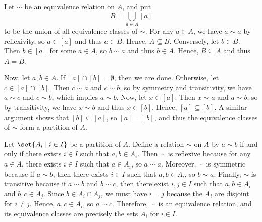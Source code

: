 \begin{proofnum}
    \item Let $\sim$ be an equivalence relation on $A$, and put
    \[
        B = \bigcup_{a \in A} [a]
    \]
    to be the union of all equivalence classes of $\sim$.
    For any $a \in A$, we have $a \sim a$ by reflexivity, so $a \in [a]$ and thus $a \in B$.
    Hence, $A \subseteq B$.
    Conversely, let $b \in B$.
    Then $b \in [a]$ for some $a \in A$, so $b \sim a$ and thus $b \in A$.
    Hence, $B \subseteq A$ and thus $A = B$.

    Now, let $a, b \in A$.
    If $[a] \cap [b] = \emptyset$, then we are done.
    Otherwise, let $c \in [a] \cap [b]$.
    Then $c \sim a$ and $c \sim b$, so by symmetry and transitivity, we have $a \sim c$ and $c \sim b$, which implies $a \sim b$.
    Now, let $x \in [a]$.
    Then $x \sim a$ and $a \sim b$, so by transitivity, we have $x \sim b$ and thus $x \in [b]$.
    Hence, $[a] \subseteq [b]$.
    A similar argument shows that $[b] \subseteq [a]$, so $[a] = [b]$, and thus the equivalence classes of $\sim$ form a partition of $A$.
    \item Let $\set{A_i \mid i \in I}$ be a partition of $A$.
    Define a relation $\sim$ on $A$ by $a \sim b$ if and only if there exists $i \in I$ such that $a, b \in A_i$.
    Then $\sim$ is reflexive because for any $a \in A$, there exists $i \in I$ such that $a \in A_i$, so $a \sim a$.
    Moreover, $\sim$ is symmetric because if $a \sim b$, then there exists $i \in I$ such that $a, b \in A_i$, so $b \sim a$.
    Finally, $\sim$ is transitive because if $a \sim b$ and $b \sim c$, then there exist $i, j \in I$ such that $a, b \in A_i$ and $b, c \in A_j$.
    Since $b \in A_i \cap A_j$, we must have $i = j$ because the $A_i$ are disjoint for $i \neq j$.
    Hence, $a, c \in A_i$, so $a \sim c$.
    Therefore, $\sim$ is an equivalence relation, and its equivalence classes are precisely the sets $A_i$ for $i \in I$.
\end{proofnum}